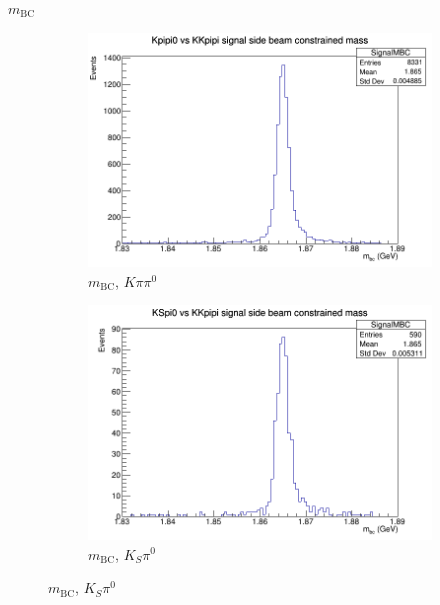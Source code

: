 \documentclass{beamer}
\begin{document}
\begin{frame}{$m_\text{BC}$}
\begin{figure}
\begin{subfigure}{0.4\textwidth}
      \includegraphics[width=\textwidth]{Kpipi0SignalMBC.png}
      \caption{$m_\text{BC}$, $K\pi\pi^0$}
    \end{subfigure}%
    \begin{subfigure}{0.4\textwidth}
      \centering
      \includegraphics[width=\textwidth]{KSpi0SignalMBC.png}
      \caption{$m_\text{BC}$, $K_S\pi^0$}
    \end{subfigure}
  \end{figure}
\end{frame}
\end{document}
